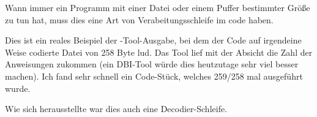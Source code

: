 
Wann immer ein Programm mit einer Datei oder einem Puffer bestimmter Größe
zu tun hat, muss dies eine Art von Verabeitungsschleife im code haben.


Dies ist ein reales Beispiel der \tracer-Tool-Ausgabe, bei dem der Code auf
irgendeine Weise codierte Datei von 258 Byte lud.
Das Tool lief mit der Absicht die Zahl der Anweisungen zukommen
(ein \ac{DBI}-Tool würde dies heutzutage sehr viel besser machen).
Ich fand sehr schnell ein Code-Stück, welches 259/258 mal ausgeführt wurde.



Wie sich herausstellte war dies auch eine Decodier-Schleife.
